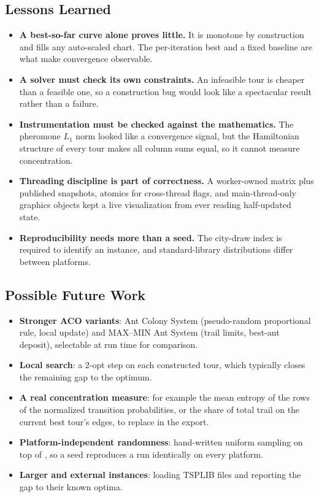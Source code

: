 \documentclass[11pt,a4paper]{article}
\begin{document}
\subsection{Lessons Learned}
\begin{itemize}
  \item \textbf{A best-so-far curve alone proves little.} It is monotone by construction and fills any
        auto-scaled chart. The per-iteration best and a fixed baseline are what make convergence observable.
  \item \textbf{A solver must check its own constraints.} An infeasible tour is cheaper than a feasible one, so a
        construction bug would look like a spectacular result rather than a failure.
  \item \textbf{Instrumentation must be checked against the mathematics.} The pheromone $L_1$ norm looked like a
        convergence signal, but the Hamiltonian structure of every tour makes all column sums equal, so it
        cannot measure concentration.
  \item \textbf{Threading discipline is part of correctness.} A worker-owned matrix plus published snapshots,
        atomics for cross-thread flags, and main-thread-only graphics objects kept a live visualization from
        ever reading half-updated state.
  \item \textbf{Reproducibility needs more than a seed.} The city-draw index is required to identify an instance,
        and standard-library distributions differ between platforms.
\end{itemize}

\subsection{Possible Future Work}
\begin{itemize}
  \item \textbf{Stronger ACO variants}: Ant Colony System (pseudo-random proportional rule, local update) and
        MAX--MIN Ant System (trail limits, best-ant deposit), selectable at run time for comparison.
  \item \textbf{Local search}: a 2-opt step on each constructed tour, which typically closes the remaining gap
        to the optimum.
  \item \textbf{A real concentration measure}: for example the mean entropy of the rows of the normalized
        transition probabilities, or the share of total trail on the current best tour's edges, to replace
         in the export.
  \item \textbf{Platform-independent randomness}: hand-written uniform sampling on top of , so
        a seed reproduces a run identically on every platform.
  \item \textbf{Larger and external instances}: loading TSPLIB files and reporting the gap to their known
        optima.
\end{itemize}
\end{document}
